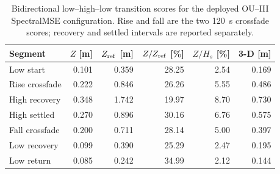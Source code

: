 \begin{table}[t]
  \centering
  \caption{Bidirectional low--high--low transition scores for the deployed OU--III SpectralMSE configuration. Rise and fall are the two \SI{120}{s} crossfade scores; recovery and settled intervals are reported separately.}
  \label{tab:ou-roundtrip-scores}
  \footnotesize
  \setlength{\tabcolsep}{2.7pt}
  \begin{tabular}{@{}lrrrrr@{}}
    \toprule
    Segment & $Z$ [m] & $Z_{\rm ref}$ [m] & $Z/Z_{\rm ref}$ [\%] & $Z/H_s$ [\%] & 3-D [m] \\
    \midrule
    Low start & 0.101 & 0.359 & 28.25 & 2.54 & 0.169 \\
    Rise crossfade & 0.222 & 0.846 & 26.26 & 5.55 & 0.486 \\
    High recovery & 0.348 & 1.742 & 19.97 & 8.70 & 0.730 \\
    High settled & 0.270 & 0.896 & 30.16 & 6.76 & 0.575 \\
    Fall crossfade & 0.200 & 0.711 & 28.14 & 5.00 & 0.397 \\
    Low recovery & 0.099 & 0.390 & 25.29 & 2.47 & 0.195 \\
    Low return & 0.085 & 0.242 & 34.99 & 2.12 & 0.144 \\
    \bottomrule
  \end{tabular}
\end{table}
